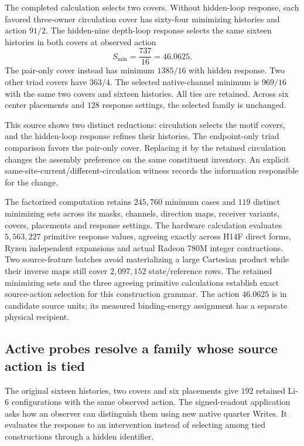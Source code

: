 The completed calculation selects two covers. Without hidden-loop response, each favored three-owner circulation cover has sixty-four minimizing histories and action $91/2$. The hidden-nine depth-loop response selects the same sixteen histories in both covers at observed action
\[
 S_{\min}=\frac{737}{16}=46.0625.
\]
The pair-only cover instead has minimum $1385/16$ with hidden response. Two other triad covers have $363/4$. The selected native-channel minimum is $969/16$ with the same two covers and sixteen histories. All ties are retained. Across six center placements and $128$ response settings, the selected family is unchanged.

This source shows two distinct reductions: circulation selects the motif covers, and the hidden-loop response refines their histories. The endpoint-only triad comparison favors the pair-only cover. Replacing it by the retained circulation changes the assembly preference on the same constituent inventory. An explicit same-site-current/different-circulation witness records the information responsible for the change.

The factorized computation retains $245{,}760$ minimum cases and $119$ distinct minimizing sets across its masks, channels, direction maps, receiver variants, covers, placements and response settings. The hardware calculation evaluates $5{,}563{,}227$ primitive response values, agreeing exactly across H14F direct forms, Ryzen independent expansions and actual Radeon 780M integer contractions. Two source-feature batches avoid materializing a large Cartesian product while their inverse maps still cover $2{,}097{,}152$ state/reference rows. The retained minimizing sets and the three agreeing primitive calculations establish exact source-action selection for this construction grammar. The action $46.0625$ is in candidate source units; its measured binding-energy assignment has a separate physical recipient.

\subsection{Active probes resolve a family whose source action is tied}

The original sixteen histories, two covers and six placements give $192$ retained Li-6 configurations with the same observed action. The signed-readout application asks how an observer can distinguish them using new native quarter Writes. It evaluates the response to an intervention instead of selecting among tied constructions through a hidden identifier. 

